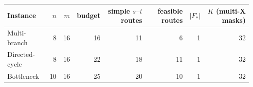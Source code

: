 \begin{tabular}{lrrrrrrr}
\toprule
Instance & $n$ & $m$ & budget & simple $s$--$t$ routes & feasible routes & $|F_\ast|$ & $K$ (multi-X masks) \\
\midrule
Multi-branch & 8 & 16 & 16 & 11 & 6 & 1 & 32 \\
Directed-cycle & 8 & 16 & 22 & 18 & 11 & 1 & 32 \\
Bottleneck & 10 & 16 & 25 & 20 & 10 & 1 & 32 \\
\bottomrule
\end{tabular}

